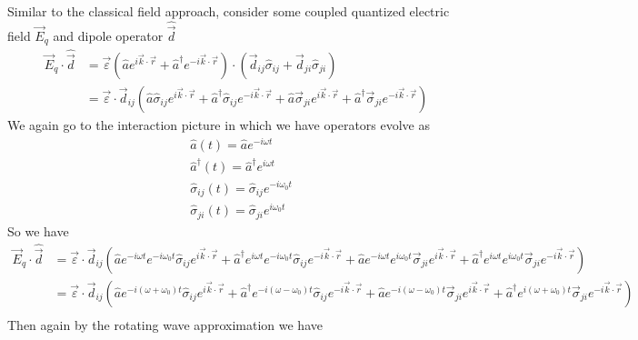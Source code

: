 \documentclass[aps,pra,showpacs,amsmath,amssymb,nofootinbib,longbibliography,superscriptaddress
]{revtex4-1}
\theoremstyle{definition}
\theoremstyle{remark}
\newcommand{\0}{\hat{0}}
\begin{document}
Similar to the classical field approach, consider some coupled quantized electric field $\vec{E}_q$ and dipole operator $\hat{\vec{d}}$
\begin{align}
    \vec{E}_q \cdot \hat{\vec{d}} &=
    \vec{\varepsilon} \left(\hat{a} e^{i \vec{k} \cdot \vec{r}} + \hat{a}^{\dagger} e^{-i \vec{k} \cdot \vec{r}}\right) \cdot \left(\vec{d}_{ij} \hat{\sigma}_{ij} + \vec{d}_{ji} \hat{\sigma}_{ji}\right) \\
    &=
    \vec{\varepsilon} \cdot \vec{d}_{ij}\left(
        \hat{a} \hat{\sigma}_{ij} e^{i \vec{k} \cdot \vec{r}} +
        \hat{a}^{\dagger} \hat{\sigma}_{ij} e^{-i \vec{k} \cdot \vec{r}} +
        \hat{a} \vec{\sigma}_{ji} e^{i \vec{k} \cdot \vec{r}} +
        \hat{a}^{\dagger} \vec{\sigma}_{ji} e^{-i \vec{k} \cdot \vec{r}}
    \right)
\end{align}
We again go to the interaction picture in which we have operators evolve as
\begin{align}
    &\hat{a}(t) = \hat{a} e^{-i \omega t}\\
    &\hat{a}^{\dagger}(t) = \hat{a}^{\dagger} e^{i \omega t}\\
    &\hat{\sigma}_{ij}(t) = \hat{\sigma}_{ij} e^{-i \omega_0 t}\\
    &\hat{\sigma}_{ji}(t) = \hat{\sigma}_{ji} e^{i \omega_0 t}
\end{align}
So we have
\begin{align}
    \vec{E}_q \cdot \hat{\vec{d}} &=
    \vec{\varepsilon} \cdot \vec{d}_{ij}\left(
        \hat{a} e^{-i \omega t} e^{-i \omega_0 t} \hat{\sigma}_{ij} e^{i \vec{k} \cdot \vec{r}} +
        \hat{a}^{\dagger} e^{i \omega t} e^{-i \omega_0 t} \hat{\sigma}_{ij} e^{-i \vec{k} \cdot \vec{r}} +
        \hat{a} e^{-i \omega t} e^{i \omega_0 t}\vec{\sigma}_{ji} e^{i \vec{k} \cdot \vec{r}} +
        \hat{a}^{\dagger} e^{i \omega t} e^{i \omega_0 t}\vec{\sigma}_{ji} e^{-i \vec{k} \cdot \vec{r}}
    \right) \nonumber \\
    &=
    \vec{\varepsilon} \cdot \vec{d}_{ij}\left(
        \hat{a} e^{-i (\omega + \omega_0) t} \hat{\sigma}_{ij} e^{i \vec{k} \cdot \vec{r}} +
        \hat{a}^{\dagger} e^{-i (\omega - \omega_0) t} \hat{\sigma}_{ij} e^{-i \vec{k} \cdot \vec{r}} +
        \hat{a} e^{-i (\omega - \omega_0) t}\vec{\sigma}_{ji} e^{i \vec{k} \cdot \vec{r}} +
        \hat{a}^{\dagger} e^{i (\omega +\omega_0) t}\vec{\sigma}_{ji} e^{-i \vec{k} \cdot \vec{r}}
    \right) \nonumber \\
\end{align}
Then again by the rotating wave approximation we have
\end{document}
